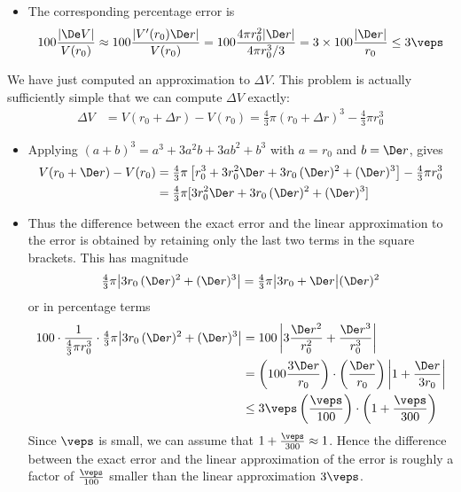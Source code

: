 \begin{eg}
\begin{itemize}
\item The corresponding percentage error is
\begin{align*}
100\frac{|\De V|}{V(r_0)}
\approx 100\frac{|V'(r_0)\De r|}{V(r_0)}
= 100\frac{4\pi r_0^2|\De r|}{4\pi r_0^3/3}
= 3\times 100\frac{|\De r|}{r_0}
\le 3\veps
\end{align*}
\end{itemize}
We have just computed an approximation to $\Delta V$. This problem is actually
sufficiently simple that we can compute $\Delta V$ exactly:
\begin{align*}
  \Delta V &=  V(r_0 + \Delta r) - V(r_0)
	    = \tfrac{4}{3} \pi (r_0 + \Delta r)^3
	      - \tfrac{4}{3} \pi r_0^3
\end{align*}
\begin{itemize}
 \item Applying $(a+b)^3=a^3+3a^2b+3ab^2+b^3$ with $a=r_0$ and $b=\De r$, gives
\begin{align*}
V(r_0+\De r)-V(r_0)&=\tfrac{4}{3}\pi
\left[r_0^3+3r_0^2\De r+3r_0\,(\De r)^2+(\De r)^3\right] - \tfrac{4}{3}\pi  r_0^3\\
&=\tfrac{4}{3}\pi[3r_0^2\De r+3r_0\,(\De r)^2+(\De r)^3]
\end{align*}

\item Thus the difference between the exact error and the linear approximation
to the error is obtained by retaining only the last two terms in the square brackets. This
has magnitude
\begin{align*}
\tfrac{4}{3}\pi\big|3r_0\,(\De r)^2+(\De r)^3\big|
=\tfrac{4}{3}\pi\big|3r_0+\De r\big|(\De r)^2
\end{align*}
or in percentage terms
\begin{align*}
100\cdot \dfrac{1}{\tfrac{4}{3}\pi r_0^3} \cdot
\tfrac{4}{3}\pi \big|3r_0\,(\De r)^2+(\De r)^3\big|
%
&=100\left|3\frac{\De r^2}{r_0^2}+\frac{\De r^3}{r_0^3}\right|\\
%
&=\left(100 \frac{3\De r}{r_0}\right)
\cdot \left(\frac{\De r}{r_0}\right)
\left|1 +\frac{\De r}{3r_0}\right|\\
%
& \le 3\veps \left(\frac{\veps}{100}\right)\cdot \left(1+\frac{\veps}{300}\right)
\end{align*}
Since $\veps$ is small, we can assume that $1 + \frac{\veps}{300} \approx 1$. Hence the
difference between the exact error and the linear approximation of the error is roughly a
factor of $\tfrac{\veps}{100}$ smaller than the linear approximation $3\veps$.



\end{itemize}
\end{eg}
